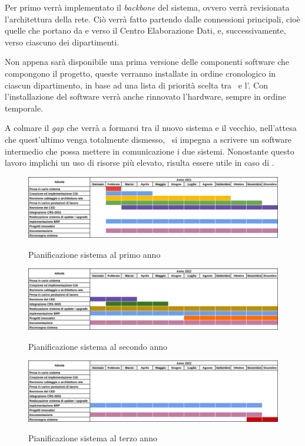 		Per primo verrà implementato il \textit{backbone} del sistema, ovvero verrà revisionata l'architettura della rete.
		Ciò verrà fatto partendo dalle connessioni principali, cioè quelle che portano da e verso il Centro Elaborazione Dati, e, successivamente, verso ciascuno dei dipartimenti.
		
		Non appena sarà disponibile una prima versione delle componenti software che compongono il progetto, queste verranno installate in ordine cronologico in ciascun dipartimento, in base ad una lista di priorità scelta tra \azienda~e l'\istituto.
		Con l'installazione del software verrà anche rinnovato l'hardware, sempre in ordine temporale.
		
		A colmare il \textit{gap} che verrà a formarsi tra il nuovo sistema e il vecchio, nell'attesa che quest'ultimo venga totalmente dismesso, \azienda~si impegna a scrivere un software intermedio che possa mettere in comunicazione i due sistemi.
		Nonostante questo lavoro implichi un uso di risorse più elevato, risulta essere utile in caso di \rollback.
	
	\begin{figure}
		\centering
		\includegraphics[width=\linewidth-2cm]{img/pianificazione_anno_1.png}
		\caption{Pianificazione sistema al primo anno}
		\label{fig:anno_1}
		\includegraphics[width=\linewidth-2cm]{img/pianificazione_anno_2.png}
		\label{fig:anno_2}
		\caption{Pianificazione sistema al secondo anno}
		\includegraphics[width=\linewidth-2cm]{img/pianificazione_anno_3.png}
		\label{fig:anno_3}
		\caption{Pianificazione sistema al terzo anno}
	\end{figure}
	
